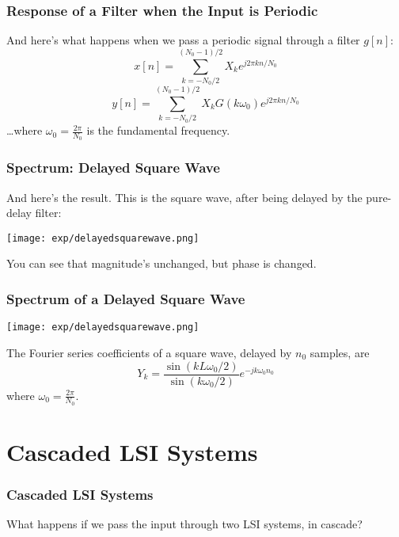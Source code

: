 \documentclass{beamer}
\begin{document}
\begin{frame}
  \frametitle{Response of a Filter when the Input is Periodic}

  And here's what happens when we pass a periodic signal through a filter $g[n]$:
  \[
  x[n] =\sum_{k=-N_0/2}^{(N_0-1)/2} X_k e^{j2\pi kn/N_0}
  \]
  \[
  y[n] = \sum_{k=-N_0/2}^{(N_0-1)/2} X_k G(k\omega_0) e^{j2\pi kn/N_0}
  \]
  \ldots where $\omega_0=\frac{2\pi}{N_0}$ is the fundamental frequency.
\end{frame}

\begin{frame}
  \frametitle{Spectrum: Delayed Square Wave} And here's the result.
  This is the square wave, after being delayed by the pure-delay
  filter:
  \centerline{\texttt{[image: exp/delayedsquarewave.png]}}
  You can see that magnitude's unchanged, but phase is changed.
\end{frame}

\begin{frame}
  \frametitle{Spectrum of a Delayed Square Wave}

  \centerline{\texttt{[image: exp/delayedsquarewave.png]}}
  The Fourier series coefficients of a square wave, delayed by $n_0$
  samples, are
  \[
  Y_k = 
  \frac{\sin(kL\omega_0/2)}{\sin(k\omega_0/2)}e^{-jk\omega_0 n_0}
  \]
  where $\omega_0=\frac{2\pi}{N_0}$.
\end{frame}


\section[Cascades]{Cascaded LSI Systems}
\setcounter{subsection}{1}

\begin{frame}
  \frametitle{Cascaded LSI Systems}

  What happens if we pass the input through two LSI systems, in cascade?
  \begin{center}
  \end{center}
\end{frame}
  
\end{document}
